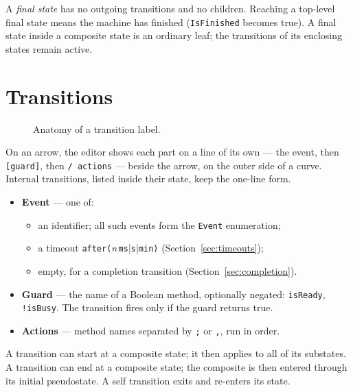 \documentclass[11pt,a4paper,openany]{report}
\newcommand{\code}[1]{\texttt{#1}}
\begin{document}
A \emph{final state} has no outgoing transitions and no children. Reaching a top-level final state
means the machine has finished (\code{IsFinished} becomes true). A final state inside a composite state
is an ordinary leaf; the transitions of its enclosing states remain active.

\section{Transitions}
\begin{figure}[H]
\centering
{}
\caption{Anatomy of a transition label.}
\end{figure}
\noindent On an arrow, the editor shows each part on a line of its own --- the event, then
\code{[guard]}, then \code{/ actions} --- beside the arrow, on the outer side of a curve. Internal
transitions, listed inside their state, keep the one-line form.
\begin{itemize}[itemsep=1pt]
  \item \textbf{Event} --- one of:
        \begin{itemize}[itemsep=0pt]
          \item an identifier; all such events form the \code{Event} enumeration;
          \item a timeout \code{after(}\textit{n}\,\code{ms}|\code{s}|\code{min)} (Section~\ref{sec:timeouts});
          \item empty, for a completion transition (Section~\ref{sec:completion}).
        \end{itemize}
  \item \textbf{Guard} --- the name of a Boolean method, optionally negated: \code{isReady},
        \code{!isBusy}. The transition fires only if the guard returns true.
  \item \textbf{Actions} --- method names separated by \code{;} or \code{,}, run in order.
\end{itemize}
A transition can start at a composite state; it then applies to all of its substates. A transition can
end at a composite state; the composite is then entered through its initial pseudostate. A self
transition exits and re-enters its state.
\end{document}
